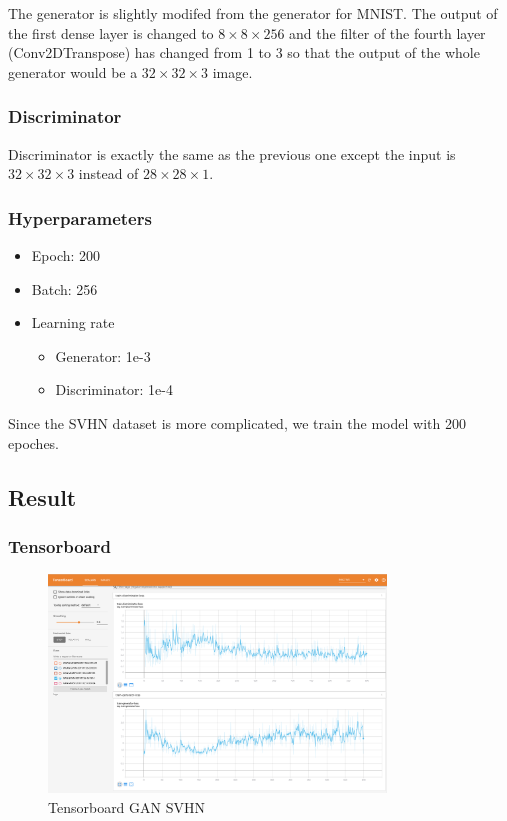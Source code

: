 \documentclass{article}
\begin{document}
The generator is slightly modifed from the generator for MNIST. 
The output of the first dense layer is changed to $8\times 8\times 256$ 
and the filter of the fourth layer (Conv2DTranspose) has changed from 1 to 3
so that the output of the whole generator would be a $32\times 32\times 3$ image.

\subsubsection{Discriminator}

Discriminator is exactly the same as the previous one except the input is $32\times 32\times 3$ instead of $28\times 28\times 1$.

\subsubsection{Hyperparameters}

\begin{itemize}
  \item Epoch: 200
  \item Batch: 256
  \item Learning rate
    \begin{itemize}
      \item Generator: 1e-3
      \item Discriminator: 1e-4
    \end{itemize}
\end{itemize}

Since the SVHN dataset is more complicated, we train the model with 200 epoches.

\subsection{Result}

\subsubsection{Tensorboard}

\begin{figure}[!htb]
  \centering
  \includegraphics[width=0.8\textwidth]{imgs/tensorboard-GAN-SVHN.png}
  \caption{Tensorboard GAN SVHN}
  \label{fig_TB_GAN_SVHN}
\end{figure}
\end{document}
